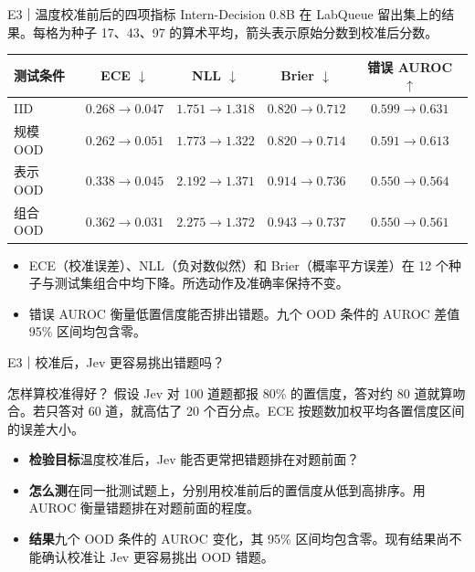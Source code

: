 \documentclass{beamer}
\begin{document}
\begin{frame}{E3｜温度校准前后的四项指标}
  \small
  Intern-Decision 0.8B 在 LabQueue 留出集上的结果。每格为种子 17、43、97 的算术平均，箭头表示原始分数到校准后分数。

  \medskip
  {\centering
  \scriptsize
  \setlength{\tabcolsep}{4pt}
  \begin{tabular}{@{}lcccc@{}}
    \toprule
    \textbf{测试条件} & \textbf{ECE $\downarrow$} & \textbf{NLL $\downarrow$} & \textbf{Brier $\downarrow$} & \textbf{错误 AUROC $\uparrow$}\\
    \midrule
    IID      & $0.268\to0.047$ & $1.751\to1.318$ & $0.820\to0.712$ & $0.599\to0.631$\\
    规模 OOD & $0.262\to0.051$ & $1.773\to1.322$ & $0.820\to0.714$ & $0.591\to0.613$\\
    表示 OOD & $0.338\to0.045$ & $2.192\to1.371$ & $0.914\to0.736$ & $0.550\to0.564$\\
    组合 OOD & $0.362\to0.031$ & $2.275\to1.372$ & $0.943\to0.737$ & $0.550\to0.561$\\
    \bottomrule
  \end{tabular}\par}

  \medskip
  \begin{itemize}
    \item ECE（校准误差）、NLL（负对数似然）和 Brier（概率平方误差）在 12 个种子与测试集组合中均下降。所选动作及准确率保持不变。
    \item 错误 AUROC 衡量低置信度能否排出错题。九个 OOD 条件的 AUROC 差值 95\% 区间均包含零。
  \end{itemize}
\end{frame}

\begin{frame}{E3｜校准后，Jev 更容易挑出错题吗？}
  \small
  \begin{block}{怎样算校准得好？}
    假设 Jev 对 100 道题都报 80\% 的置信度，答对约 80 道就算吻合。若只答对 60 道，就高估了 20 个百分点。ECE 按题数加权平均各置信度区间的误差大小。
  \end{block}

  \begin{itemize}
    \item \textbf{检验目标}\quad 温度校准后，Jev 能否更常把错题排在对题前面？
    \item \textbf{怎么测}\quad 在同一批测试题上，分别用校准前后的置信度从低到高排序。用 AUROC 衡量错题排在对题前面的程度。
    \item \textbf{结果}\quad 九个 OOD 条件的 AUROC 变化，其 95\% 区间均包含零。现有结果尚不能确认校准让 Jev 更容易挑出 OOD 错题。
  \end{itemize}
\end{frame}
\end{document}
